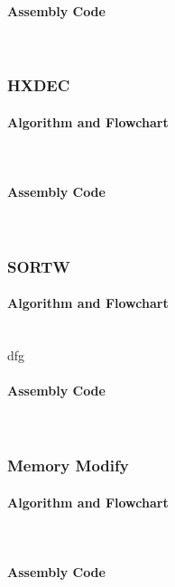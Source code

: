 \documentclass[12pt]{article}
\begin{document}
			\paragraph{Assembly Code}~\\
			
			
			\subsubsection{HXDEC}
			\paragraph{Algorithm and Flowchart}~\\
			
			\paragraph{Assembly Code}~\\
			
			
			\subsubsection{SORTW}
			\paragraph{Algorithm and Flowchart}~\\
			dfg
			\paragraph{Assembly Code}~\\
			
			
			\subsubsection{Memory Modify}
			\paragraph{Algorithm and Flowchart}~\\
			\paragraph{Assembly Code}~\\
			
			
\end{document}
